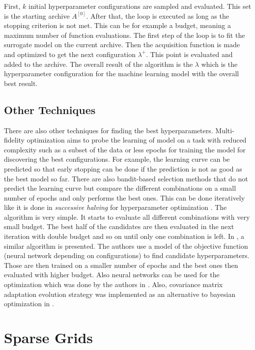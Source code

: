 First, $ k $ initial hyperparameter configurations are sampled and evaluated. This set is the starting archive $ A^{[0]} $. After that, the loop is executed as long as the stopping criterion is not met. This can be for example a budget, meaning a maximum number of function evaluations. The first step of the loop is to fit the surrogate model on the current archive. Then the acquisition function is made and optimized to get the next configuration $ \lambda^+ $. This point is evaluated and added to the archive. The overall result of the algorithm is the $ \lambda $ which is the hyperparameter configuration for the machine learning model with the overall best result.

\subsection{Other Techniques}
There are also other techniques for finding the best hyperparameters. Multi-fidelity optimization \cite{feurer2019hyperparameter} aims to probe the learning of model on a task with reduced complexity such as a subset of the data or less epochs for training the model for discovering the best configurations. For example, the learning curve can be predicted so that early stopping can be done if the prediction is not as good as the best model so far. There are also bandit-based selection methods that do not predict the learning curve but compare the different combinations on a small number of epochs and only performs the best ones. This can be done iteratively like it is done in \textit{successive halving} for hyperparameter optimization \cite{jamieson2016non}. The algorithm is very simple. It starts to evaluate all different combinations with very small budget. The best half of the candidates are then evaluated in the next iteration with double budget and so on until only one combination is left. In \cite{8030298}, a similar algorithm is presented. The authors use a model of the objective function (neural network depending on configurations) to find candidate hyperparameters. Those are then trained on a smaller number of epochs and the best ones then evaluated with higher budget. Also neural networks can be used for the optimization which was done by the authors in \cite{smithson2016neural}. Also, covariance matrix adaptation evolution strategy was implemented as an alternative to bayesian optimization in \cite{loshchilov2016cma}. 


\section{Sparse Grids}

